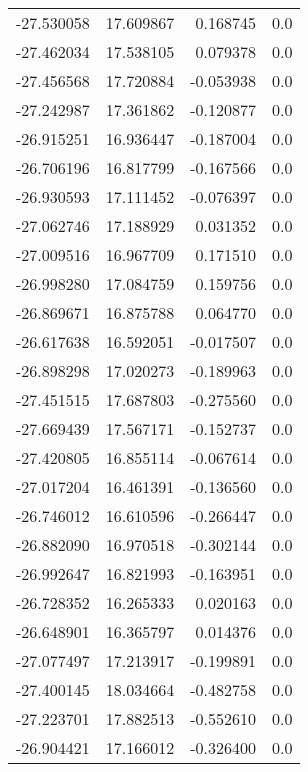 \begin{tabular}{rrrr}
      -27.530058 &        17.609867 &    0.168745 &   0.0 \\
      -27.462034 &        17.538105 &    0.079378 &   0.0 \\
      -27.456568 &        17.720884 &   -0.053938 &   0.0 \\
      -27.242987 &        17.361862 &   -0.120877 &   0.0 \\
      -26.915251 &        16.936447 &   -0.187004 &   0.0 \\
      -26.706196 &        16.817799 &   -0.167566 &   0.0 \\
      -26.930593 &        17.111452 &   -0.076397 &   0.0 \\
      -27.062746 &        17.188929 &    0.031352 &   0.0 \\
      -27.009516 &        16.967709 &    0.171510 &   0.0 \\
      -26.998280 &        17.084759 &    0.159756 &   0.0 \\
      -26.869671 &        16.875788 &    0.064770 &   0.0 \\
      -26.617638 &        16.592051 &   -0.017507 &   0.0 \\
      -26.898298 &        17.020273 &   -0.189963 &   0.0 \\
      -27.451515 &        17.687803 &   -0.275560 &   0.0 \\
      -27.669439 &        17.567171 &   -0.152737 &   0.0 \\
      -27.420805 &        16.855114 &   -0.067614 &   0.0 \\
      -27.017204 &        16.461391 &   -0.136560 &   0.0 \\
      -26.746012 &        16.610596 &   -0.266447 &   0.0 \\
      -26.882090 &        16.970518 &   -0.302144 &   0.0 \\
      -26.992647 &        16.821993 &   -0.163951 &   0.0 \\
      -26.728352 &        16.265333 &    0.020163 &   0.0 \\
      -26.648901 &        16.365797 &    0.014376 &   0.0 \\
      -27.077497 &        17.213917 &   -0.199891 &   0.0 \\
      -27.400145 &        18.034664 &   -0.482758 &   0.0 \\
      -27.223701 &        17.882513 &   -0.552610 &   0.0 \\
      -26.904421 &        17.166012 &   -0.326400 &   0.0 \\

\end{tabular}
